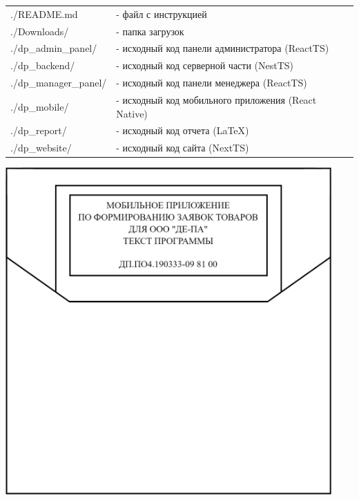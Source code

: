 

\newpage
{}
\thispagestyle{plain}
\pagestyle{plain}

\tableofcontents
\noindent
\begin{tabular}{p{5cm}p{12cm}}
    ./README.md            & - файл с инструкцией \\
    ./Downloads/            & - папка загрузок \\
    ./dp\_admin\_panel/     & - исходный код панели администратора (ReactTS) \\
    ./dp\_backend/          & - исходный код серверной части (NestTS) \\
    ./dp\_manager\_panel/   & - исходный код панели менеджера (ReactTS) \\
    ./dp\_mobile/           & - исходный код мобильного приложения (React Native) \\
    ./dp\_report/           & - исходный код отчета (LaTeX) \\
    ./dp\_website/          & - исходный код сайта (NextTS) \\
\end{tabular}

\begin{table}[p]
    \centering
    
    \includegraphics[width=12.5cm]
    {images/12/disk.png}
\end{table}
